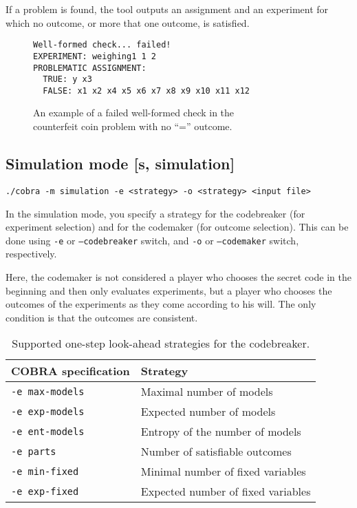 If a problem is found, the tool outputs an assignment and an experiment
  for which no outcome, or more that one outcome, is satisfied.

\begin{figure}[ht]
\begin{lstlisting}[xleftmargin=.2\textwidth]
Well-formed check... failed!
EXPERIMENT: weighing1 1 2
PROBLEMATIC ASSIGNMENT:
  TRUE: y x3
  FALSE: x1 x2 x4 x5 x6 x7 x8 x9 x10 x11 x12
\end{lstlisting}
\caption{An example of a failed well-formed check in the\\ counterfeit coin problem
 with no ``='' outcome.}
\end{figure}

\subsection{Simulation mode [s, simulation]}

\centerline{\texttt{./cobra -m simulation -e <strategy> -o <strategy> <input file> }}

In the simulation mode, you specify a strategy
  for the codebreaker (for experiment selection)
  and for the codemaker (for outcome selection).
This can be done using \texttt{-e} or \texttt{--codebreaker} switch, and
\texttt{-o} or \texttt{--codemaker} switch, respectively.

Here, the codemaker is not considered a player who chooses
  the secret code in the beginning and then only evaluates experiments,
  but a player who chooses the outcomes
  of the experiments as they come according to his will.
The only condition is that the outcomes are consistent.

\begin{table}[h!]
\begin{center}
\begin{tabular}{|l|p{7cm}|} \hline
COBRA specification & Strategy \\\hline
 \texttt{-e max-models} & Maximal number of models \\
\texttt{-e exp-models} & Expected number of models \\
\texttt{-e ent-models} & Entropy of the number of models \\
\texttt{-e parts} & Number of satisfiable outcomes \\
\texttt{-e min-fixed} & Minimal number of fixed variables \\
\texttt{-e exp-fixed} & Expected number of fixed variables \\\hline
\end{tabular}
\caption{Supported one-step look-ahead strategies for the codebreaker.} \label{tbl:stge}
\end{center}
\end{table}

